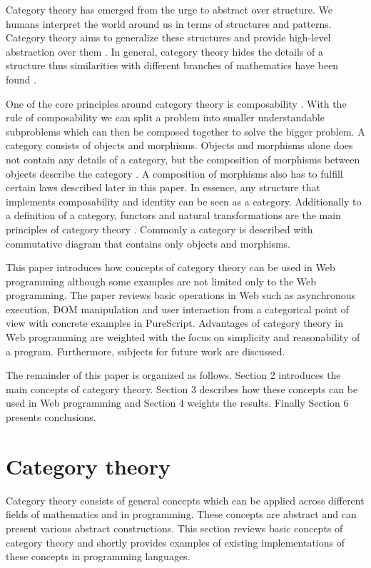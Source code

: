 \documentclass[article]{aaltoseries}
\begin{document}
  Category theory has emerged from the urge to abstract over structure. We
  humans interpret the world around us in terms of structures and patterns.
  Category theory aims to generalize these structures and provide high-level
  abstraction over them \cite{eilenberg1945general}. In general, category theory
  hides the details of a structure thus similarities with different branches of
  mathematics have been found \cite{lawvere1996adjointness}.

  One of the core principles around category theory is composability
  \cite{barr1990category}. With the rule of composability we can split a problem
  into smaller understandable subproblems which can then be composed together to
  solve the bigger problem. A category consists of objects and morphisms.
  Objects and morphisms alone does not contain any details of a category, but
  the composition of morphisms between objects describe the category
  \cite{computational, barr1990category}. A composition of morphisms also has to
  fulfill certain laws described later in this paper. In essence, any structure
  that implements composability and identity can be seen as a category.
  Additionally to a definition of a category, functors and natural transformations
  are the main principles of category theory \cite{awodey2006category,
    computational}. Commonly a category is described with commutative diagram
  that contains only objects and morphisms.
 
  This paper introduces how concepts of category theory can be used in Web
  programming although some examples are not limited only to the Web programming.
  The paper reviews basic operations in Web such as asynchronous execution, DOM
  manipulation and user interaction from a categorical point of view with
  concrete examples in PureScript. Advantages of category theory in Web
  programming are weighted with the focus on simplicity and reasonability of a
  program. Furthermore, subjects for future work are discussed.
 
  The remainder of this paper is organized as follows. Section 2 introduces the
  main concepts of category theory. Section 3 describes how these concepts can
  be used in Web programming and Section 4 weights the results. Finally Section
  6 presents conclusions.


\section{Category theory}
Category theory consists of general concepts which can be applied across
different fields of mathematics and in programming. These concepts are abstract
and can present various abstract constructions. This section reviews
basic concepts of category theory and shortly provides examples of existing
implementations of these concepts in programming languages.
\end{document}
